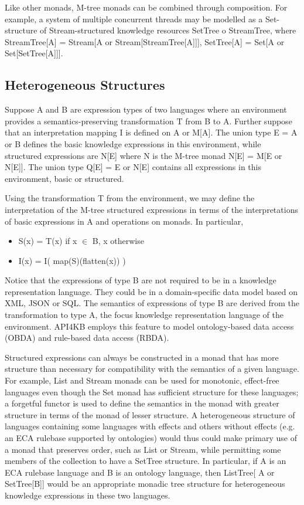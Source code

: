 \documentclass[runningheads]{llncs}
\begin{document}
Like other monads, M-tree monads can be combined through composition.
For example, a system of multiple concurrent threads may be modelled as a Set-structure of Stream-structured knowledge resources SetTree o StreamTree, where StreamTree[A] = Stream[A or Stream[StreamTree[A]]], SetTree[A] = Set[A or Set[SetTree[A]]].


\subsection{Heterogeneous Structures}
Suppose A and B are expression types of two languages where an environment provides a semantics-preserving transformation T from B to A.
Further suppose that an interpretation mapping I is defined on A or M[A].
The union type E = A or B defines the basic knowledge expressions in this environment, while structured expressions are N[E] where N is the M-tree monad  N[E] = M[E or N[E]].
The union type Q[E] = E or N[E] contains all expressions in this environment, basic or structured. 

Using the transformation T from the environment, we may define the interpretation of the M-tree structured expressions in terms of the interpretations of basic expressions in A and operations on monads. In particular,
\begin{itemize}
\item S(x) = T(x) if x $\in$ B, x otherwise
\item I(x) = I( map(S)(flatten(x)) )
\end{itemize}
Notice that the expressions of type B are not required to be in a knowledge representation language. They could be in a domain-specific data model based on XML, JSON or SQL. The semantics of expressions of type B are derived from the transformation to type A, the focus  knowledge representation language of the environment. API4KB employs this feature to model ontology-based data access (OBDA) and rule-based data access (RBDA).

Structured expressions can always be constructed in a monad that has more structure than necessary for compatibility with the semantics of a given language.
For example, List and Stream monads can be used for monotonic, effect-free languages even though the Set monad has sufficient structure for these languages;
a forgetful functor is used to define the semantics in the monad with greater structure in terms of the monad of lesser structure.
A heterogeneous structure of languages containing some languages with effects and others without effects (e.g. an ECA rulebase supported by ontologies) would thus could make primary use of a monad that preserves order, such as List or Stream, while permitting some members of the collection to have a SetTree structure. In particular, if A is an ECA rulebase language and B is an ontology language, then ListTree[ A or SetTree[B]] would be an appropriate monadic tree structure for heterogeneous knowledge expressions in these two languages.
\end{document}
